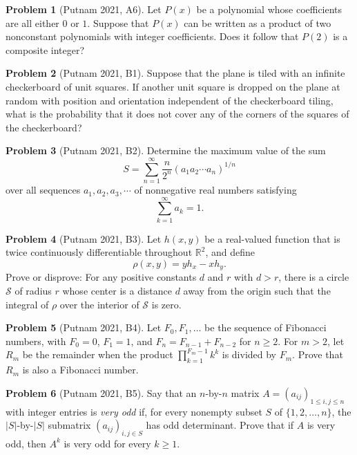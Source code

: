 \documentclass{scrartcl}
\theoremstyle{definition}
\newtheorem*{prob}{Problem}
\begin{document}
\begin{prob}[Putnam 2021, A6] 
Let $P(x)$ be a polynomial whose coefficients are all either $0$ or $1$.
Suppose that $P(x)$ can be written as a product of two nonconstant polynomials with integer coefficients. Does it follow that $P(2)$ is a composite integer?

\end{prob}

\begin{prob}[Putnam 2021, B1]
Suppose that the plane is tiled with an infinite checkerboard of unit squares. If another unit square is dropped on the plane at random with position and orientation independent of the checkerboard tiling, what is the probability that it does not cover any of the corners of the squares of the checkerboard?

\end{prob}

\begin{prob}[Putnam 2021, B2]
Determine the maximum value of the sum
\[
S = \sum_{n=1}^\infty \frac{n}{2^n} (a_1 a_2 \cdots a_n)^{1/n}
\]
over all sequences $a_1, a_2, a_3, \cdots$ of nonnegative real numbers satisfying
\[
\sum_{k=1}^\infty a_k = 1.
\]

\end{prob}

\begin{prob}[Putnam 2021, B3]
Let $h(x,y)$ be a real-valued function that is twice continuously differentiable throughout $\mathbb{R}^2$, and define
\[
\rho(x,y) = yh_x - xh_y.
\]
Prove or disprove: For any positive constants $d$ and $r$ with $d>r$, there is a circle $\mathcal{S}$ of radius $r$ whose center is a distance $d$ away from the origin such that the integral of $\rho$ over the interior of $\mathcal{S}$ is zero.

\end{prob}

\begin{prob}[Putnam 2021, B4]
Let $F_0, F_1, \dots$ be the sequence of Fibonacci numbers, with $F_0 = 0$, $F_1 = 1$, and $F_n = F_{n-1} + F_{n-2}$ for $n \geq 2$. For $m > 2$, let $R_m$ be the remainder when the product $\prod_{k=1}^{F_m-1} k^k$ is divided by $F_m$. Prove that $R_m$ is also a Fibonacci number.

\end{prob}

\begin{prob}[Putnam 2021, B5]
Say that an $n$-by-$n$ matrix $A = (a_{ij})_{1 \leq i,j \leq n}$ with integer entries is \emph{very odd} if, for every nonempty subset $S$ of $\{1,2,\dots,n\}$, the $|S|$-by-$|S|$ submatrix $(a_{ij})_{i,j \in S}$ has odd determinant. Prove that if $A$ is very odd, then $A^k$ is very odd for every $k \geq 1$.

\end{prob}
\end{document}
